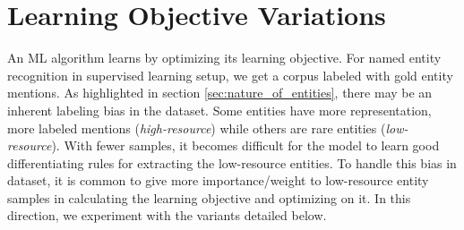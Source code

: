 \section{Learning Objective Variations}
An ML algorithm learns by optimizing its learning objective. For named entity recognition in supervised learning setup, we get a corpus labeled with gold entity mentions. As highlighted in section \ref{sec:nature_of_entities}, there may be an inherent labeling bias in the dataset. Some entities have more representation, more labeled mentions (\textit{high-resource}) while others are rare entities (\textit{low-resource}). With fewer samples, it becomes difficult for the model to learn good differentiating rules for extracting the low-resource entities. To handle this bias in dataset, it is common to give more importance/weight to low-resource entity samples in calculating the learning objective and optimizing on it. In this direction, we experiment with the variants detailed below.

